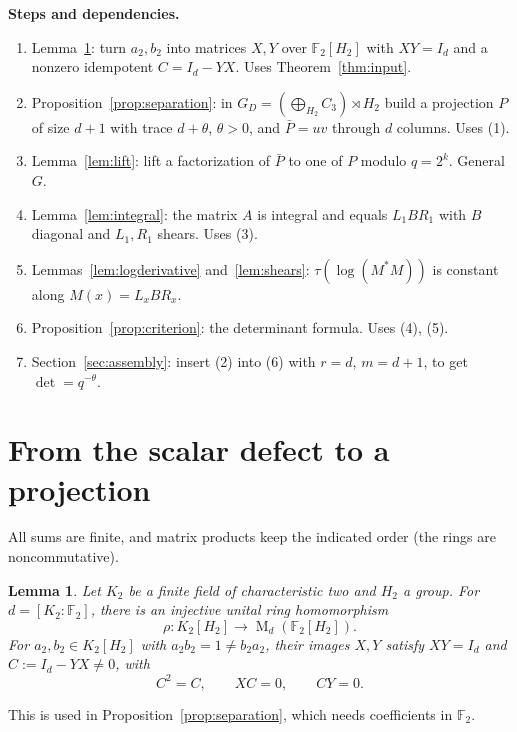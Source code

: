 \documentclass[11pt]{article}
\newtheorem{lemma}[theorem]{Lemma}
\theoremstyle{remark}
\numberwithin{equation}{section}
\newcommand{\F}{\mathbb F}
\newcommand{\Mat}{\operatorname{M}}
\begin{document}
\textbf{Steps and dependencies.}
\begin{enumerate}[label=(\arabic*),leftmargin=2.2em,itemsep=1pt]
\item Lemma~\ref{lem:binary}: turn $a_2,b_2$ into matrices $X,Y$ over $\F_2[H_2]$ with $XY=I_d$ and a nonzero idempotent $C=I_d-YX$. Uses Theorem~\ref{thm:input}.
\item Proposition~\ref{prop:separation}: in $G_D=(\bigoplus_{H_2}C_3)\rtimes H_2$ build a projection $P$ of size $d+1$ with trace $d+\theta$, $\theta>0$, and $\bar P=uv$ through $d$ columns. Uses (1).
\item Lemma~\ref{lem:lift}: lift a factorization of $\bar P$ to one of $P$ modulo $q=2^k$. General $G$.
\item Lemma~\ref{lem:integral}: the matrix $A$ is integral and equals $L_1BR_1$ with $B$ diagonal and $L_1,R_1$ shears. Uses (3).
\item Lemmas~\ref{lem:logderivative} and~\ref{lem:shears}: $\tau(\log(M^*M))$ is constant along $M(x)=L_xBR_x$.
\item Proposition~\ref{prop:criterion}: the determinant formula. Uses (4), (5).
\item Section~\ref{sec:assembly}: insert (2) into (6) with $r=d$, $m=d+1$, to get $\det=q^{-\theta}$.
\end{enumerate}

\section{From the scalar defect to a projection}
\label{sec:projection}

All sums are finite, and matrix products keep the indicated order (the rings are noncommutative).

\begin{lemma}\label{lem:binary}
Let $K_2$ be a finite field of characteristic two and $H_2$ a group.
For $d=[K_2:\F_2]$, there is an injective unital ring homomorphism
\[
 \rho:K_2[H_2]\longrightarrow\Mat_d(\F_2[H_2]).
\]
For $a_2,b_2\in K_2[H_2]$ with $a_2b_2=1\ne b_2a_2$, their images $X,Y$ satisfy
$XY=I_d$ and $C:=I_d-YX\ne0$, with
\begin{equation}\label{eq:defect}
 C^2=C,\qquad XC=0,\qquad CY=0.
\end{equation}
\end{lemma}

This is used in Proposition~\ref{prop:separation}, which needs coefficients in $\F_2$.
\end{document}
